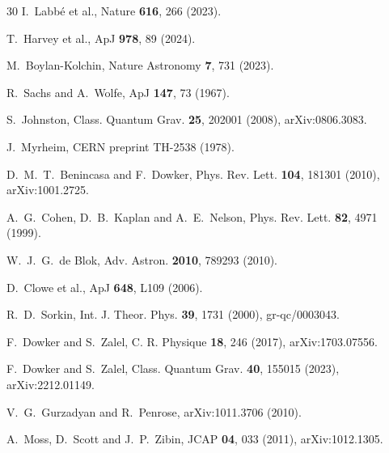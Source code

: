 \documentclass[12pt]{article}
\begin{document}
\begin{thebibliography}{30}
 I.~Labb\'e et al., Nature {\bf 616}, 266 (2023).

 T.~Harvey et al., ApJ {\bf 978}, 89 (2024).

 M.~Boylan-Kolchin, Nature Astronomy {\bf 7}, 731 (2023).

 R.~Sachs and A.~Wolfe, ApJ {\bf 147}, 73 (1967).

 S.~Johnston, Class. Quantum Grav. {\bf 25}, 202001 (2008), arXiv:0806.3083.

 J.~Myrheim, CERN preprint TH-2538 (1978).

 D.~M.~T.~Benincasa and F.~Dowker, Phys. Rev. Lett. {\bf 104}, 181301 (2010), arXiv:1001.2725.

 A.~G.~Cohen, D.~B.~Kaplan and A.~E.~Nelson, Phys. Rev. Lett. {\bf 82}, 4971 (1999).

 W.~J.~G.~de Blok, Adv. Astron. {\bf 2010}, 789293 (2010).

 D.~Clowe et al., ApJ {\bf 648}, L109 (2006).

 R.~D.~Sorkin, Int. J. Theor. Phys. {\bf 39}, 1731 (2000), gr-qc/0003043.

 F.~Dowker and S.~Zalel, C. R. Physique {\bf 18}, 246 (2017), arXiv:1703.07556.

 F.~Dowker and S.~Zalel, Class. Quantum Grav. {\bf 40}, 155015 (2023), arXiv:2212.01149.

 V.~G.~Gurzadyan and R.~Penrose, arXiv:1011.3706 (2010).

 A.~Moss, D.~Scott and J.~P.~Zibin, JCAP {\bf 04}, 033 (2011), arXiv:1012.1305.

\end{thebibliography}
\end{document}
